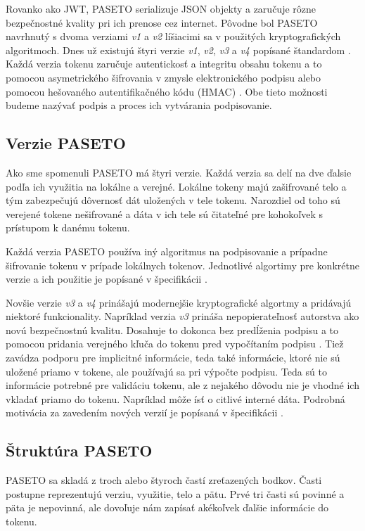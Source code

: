 Rovanko ako JWT, PASETO serializuje JSON objekty a zaručuje rôzne bezpečnostné kvality pri ich prenose cez internet. Pôvodne bol PASETO navrhnutý s dvoma verziami \textit{v1} a \textit{v2} líšiacimi sa v použitých kryptografických algoritmoch. Dnes už existujú štyri verzie \textit{v1}, \textit{v2}, \textit{v3} a \textit{v4} popísané štandardom \cite{paseto_git}. Každá verzia tokenu zaručuje autentickosť a integritu obsahu tokenu a to pomocou asymetrického šifrovania v zmysle elektronického podpisu alebo pomocou hešovaného autentifikačného kódu (HMAC) \cite{hmac}. Obe tieto možnosti budeme nazývať podpis a proces ich vytvárania podpisovanie.

\subsection{Verzie PASETO}

Ako sme spomenuli PASETO má štyri verzie. Každá verzia sa delí na dve ďalsie podľa ich využitia na lokálne a verejné. Lokálne tokeny majú zašifrované telo a tým zabezpečujú dôvernosť dát uložených v tele tokenu. Narozdiel od toho sú verejené tokene nešifrované a dáta v ich tele sú čitateľné pre kohokoľvek s prístupom k danému tokenu.

Každá verzia PASETO používa iný algoritmus na podpisovanie a prípadne šifrovanie tokenu v prípade lokálnych tokenov. Jednotlivé algortimy pre konkrétne verzie a ich použitie je popísané v špecifikácii \cite{paseto_git}.

Novšie verzie \textit{v3} a \textit{v4} prinášajú modernejšie kryptografické algortmy a pridávajú niektoré funkcionality. Napríklad verzia \textit{v3} prináša nepopierateľnosť autorstva ako novú bezpečnostnú kvalitu. Dosahuje to dokonca bez predĺženia podpisu a to pomocou pridania verejného kľuča do tokenu pred vypočítaním podpisu \cite{ueo}. Tiež zavádza podporu pre implicitné informácie, teda také informácie, ktoré nie sú uložené priamo v tokene, ale používajú sa pri výpočte podpisu. Teda sú to informácie potrebné pre validáciu tokenu, ale z nejakého dôvodu nie je vhodné ich vkladať priamo do tokenu. Napríklad môže ísť o citlivé interné dáta. Podrobná motivácia za zavedením nových verzií je popísaná v špecifikácii \cite{paseto_git}.

\subsection{Štruktúra PASETO}

PASETO sa skladá z troch alebo štyroch častí zreťazených bodkov. Časti postupne reprezentujú verziu, využitie, telo a pätu. Prvé tri časti sú povinné a päta je nepovinná, ale dovoľuje nám zapísať akékoľvek ďalšie informácie do tokenu.

